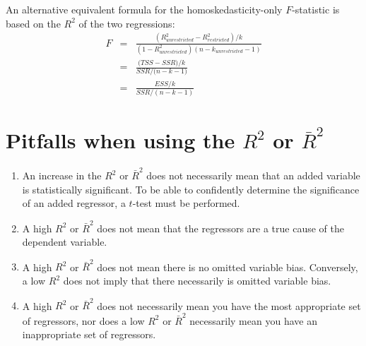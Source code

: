 An alternative equivalent formula for the homoskedasticity-only $F$-statistic is based on the $R^{2}$ of the two regressions:
\begin{eqnarray}
\nonumber
\label{Eq:HomoskedasticFStatistic2}
F &=& \frac{\left(R_{unrestricted}^{2} - R_{restricted}^{2}\right) / k}{\left(1 - R_{unrestricted}^{2}\right)\left(n - k_{unrestricted} - 1\right)}\\
\nonumber
 &=& \frac{\big(TSS - SSR\big) / k}{SSR / \big(n - k - 1\big)}\\ 
 &=& \frac{ESS / k}{SSR / (n - k - 1)}
\end{eqnarray}


\section{Pitfalls when using the \texorpdfstring{$R^{2}$}{R2} or \texorpdfstring{$\bar{R}^{2}$}{R2}}
\begin{enumerate}
	\item An increase in the $R^{2}$ or $\bar{R}^{2}$ does not necessarily mean that an added variable is statistically significant. To be able to confidently determine the significance of an added regressor, a $t$-test must be performed.
	\item A high $R^{2}$ or $\bar{R}^{2}$ does not mean that the regressors are a true cause of the dependent variable.
	\item A high $R^{2}$ or $\bar{R}^{2}$ does not mean there is no omitted variable bias. Conversely, a low $R^{2}$ does not imply that there necessarily is omitted variable bias.
	\item A high $R^{2}$ or $\bar{R}^{2}$ does not necessarily mean you have the most appropriate set of regressors, nor does a low $R^{2}$ or $\bar{R}^{2}$ necessarily mean you have an inappropriate set of regressors.
\end{enumerate}



